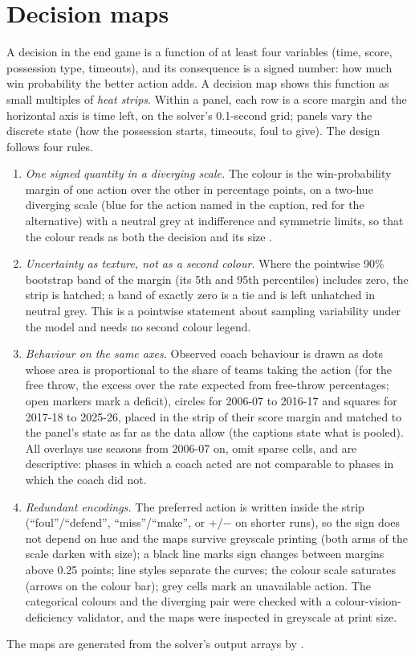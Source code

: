 \documentclass[article]{jdssv}
\begin{document}
\section{Decision maps} \label{sec:maps}

A decision in the end game is a function of at least four variables (time, score, possession type,
timeouts), and its consequence is a signed number: how much win probability the better action adds. A
decision map shows this function as small multiples of \emph{heat strips}. Within a panel, each row is a
score margin and the horizontal axis is time left, on the solver's 0.1-second grid; panels vary the
discrete state (how the possession starts, timeouts, foul to give). The design follows four rules.

\begin{enumerate}
\item \emph{One signed quantity in a diverging scale.} The colour is the win-probability margin of one action
over the other in percentage points, on a two-hue diverging scale (blue for the action named in the
caption, red for the alternative) with a neutral grey at indifference and symmetric limits, so that the
colour reads as both the decision and its size \citep{Crameri2020, Wilke2019}.
\item \emph{Uncertainty as texture, not as a second colour.} Where the pointwise 90\% bootstrap band of the
margin (its 5th and 95th percentiles) includes zero, the strip is hatched; a band of exactly zero is a tie and is
left unhatched in neutral grey. This is a pointwise statement about sampling variability under the model and
needs no second colour legend.
\item \emph{Behaviour on the same axes.} Observed coach behaviour is drawn as dots whose area is proportional
to the share of teams taking the action (for the free throw, the excess over the rate expected from free-throw
percentages; open markers mark a deficit), circles for 2006-07 to 2016-17 and squares for 2017-18 to 2025-26,
placed in the strip of their score margin and matched to the panel's state as far as the data allow (the
captions state what is pooled). All overlays use seasons from 2006-07 on, omit sparse cells, and are descriptive:
phases in which a coach acted are not comparable to phases in which the coach did not.
\item \emph{Redundant encodings.} The preferred action is written inside the strip (``foul''\slash``defend'',
``miss''\slash``make'', or $+$\slash$-$ on shorter runs), so the sign does not depend on hue and the maps survive greyscale
printing (both arms of the scale darken with size); a black line marks sign changes between margins above 0.25
points; line styles separate the curves; the colour scale saturates (arrows on the colour bar); grey cells mark an
unavailable action. The categorical colours and the diverging pair were checked
with a colour-vision-deficiency validator, and the maps were inspected in greyscale at print size.
\end{enumerate}
The maps are generated from the solver's output arrays by .
\end{document}
